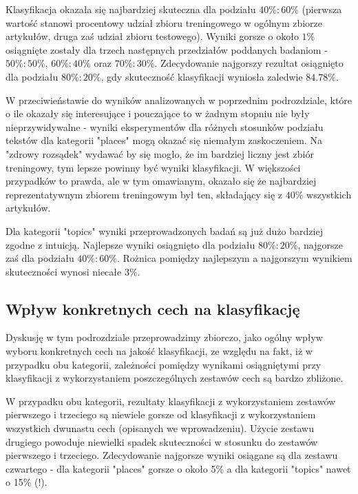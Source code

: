 \documentclass{classrep}
\begin{document}
Klasyfikacja okazała się najbardziej skuteczna dla podziału $40\%:60\%$ (pierwsza wartość stanowi procentowy udział zbioru treningowego w ogólnym zbiorze artykułów, druga zaś udział zbioru testowego). Wyniki gorsze o około $1\%$ osiągnięte zostały dla trzech następnych przedziałów poddanych badaniom - $50\%:50\%$, $60\%:40\%$ oraz $70\%:30\%$. Zdecydowanie najgorszy rezultat osiągnięto dla podziału $80\%:20\%$, gdy skuteczność klasyfikacji wyniosła zaledwie $84.78\%$.\newline

W przeciwieństawie do wyników analizowanych w poprzednim podrozdziale, które o ile okazały się interesujące i pouczające to w żadnym stopniu nie były nieprzywidywalne - wyniki eksperymentów dla różnych stosunków podziału tekstów dla kategorii "places" mogą okazać się niemałym zaskoczeniem. Na "zdrowy rozsądek" wydawać by się mogło, że im bardziej liczny jest zbiór treningowy, tym lepsze powinny być wyniki klasyfikacji. W większości przypadków to prawda, ale w tym omawianym, okazało się że najbardziej reprezentatywnym zbiorem treningowym był ten, składający się z $40\%$ wszystkich artykułów.\newline

Dla kategorii "topics" wyniki przeprowadzonych badań są już dużo bardziej zgodne z intuicją. Najlepsze wyniki osiągnięto dla podziału $80\%:20\%$, najgorsze zaś dla podziału $40\%:60\%$. Rożnica pomiędzy najlepszym a najgorszym wynikiem skuteczności wynosi niecałe $3\%$.

\subsection{Wpływ konkretnych cech na klasyfikację}
Dyskusję w tym podrozdziale przeprowadzimy zbiorczo, jako ogólny wpływ wyboru konkretnych cech na jakość klasyfikacji, ze względu na fakt, iż w przypadku obu kategorii, zależności pomiędzy wynikami osiągniętymi przy klasyfikacji z wykorzystaniem poszczególnych zestawów cech są bardzo zbliżone.\newline

W przypadku obu kategorii, rezultaty klasyfikacji z wykorzystaniem zestawów pierwszego i trzeciego są niewiele gorsze od klasyfikacji z wykorzystaniem wszystkich dwunastu cech (opisanych we wprowadzeniu). Użycie zestawu drugiego powoduje niewielki spadek skuteczności w stosunku do zestawów pierwszego i trzeciego. Zdecydowanie najgorsze wyniki osiągane są dla zestawu czwartego - dla kategorii "places" gorsze o około 5\% a dla kategorii "topics" nawet o 15\% (!). \newline
\end{document}
